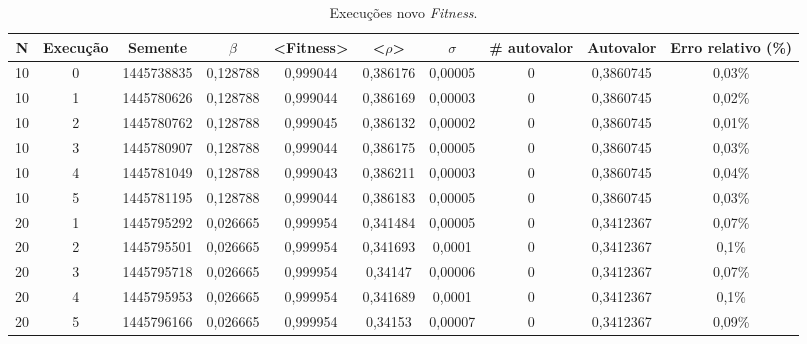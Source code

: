 	\begin{landscape}
\begin{center}
\begin{table}[htbp]
\caption{Execuções novo \textit{Fitness}.}
\label{tab:execucoesNovoFitness}
\begin{tabular}{cccccccccc}
\hline \hline
   \textbf{N} & \textbf{Execução} & \textbf{Semente} & \textbf{$\beta$} & \textbf{<Fitness>} & \textbf{<$\rho$>} & \textbf{$\sigma$} & \textbf{\# autovalor} & \textbf{Autovalor} & \textbf{Erro relativo (\%)} \\
\hline \hline
        10 &          0 & 1445738835 &   0,128788 &   0,999044 &   0,386176 &    0,00005 &          0 &  0,3860745 &     0,03\% \\
\hline
        10 &          1 & 1445780626 &   0,128788 &   0,999044 &   0,386169 &    0,00003 &          0 &  0,3860745 &     0,02\% \\
\hline
        10 &          2 & 1445780762 &   0,128788 &   0,999045 &   0,386132 &    0,00002 &          0 &  0,3860745 &     0,01\% \\
\hline
        10 &          3 & 1445780907 &   0,128788 &   0,999044 &   0,386175 &    0,00005 &          0 &  0,3860745 &     0,03\% \\
\hline
        10 &          4 & 1445781049 &   0,128788 &   0,999043 &   0,386211 &    0,00003 &          0 &  0,3860745 &     0,04\% \\
\hline
        10 &          5 & 1445781195 &   0,128788 &   0,999044 &   0,386183 &    0,00005 &          0 &  0,3860745 &     0,03\% \\
\hline
        20 &          1 & 1445795292 &   0,026665 &   0,999954 &   0,341484 &    0,00005 &          0 &  0,3412367 &     0,07\% \\
\hline
        20 &          2 & 1445795501 &   0,026665 &   0,999954 &   0,341693 &     0,0001 &          0 &  0,3412367 &      0,1\% \\
\hline
        20 &          3 & 1445795718 &   0,026665 &   0,999954 &    0,34147 &    0,00006 &          0 &  0,3412367 &     0,07\% \\
\hline
        20 &          4 & 1445795953 &   0,026665 &   0,999954 &   0,341689 &     0,0001 &          0 &  0,3412367 &      0,1\% \\
\hline
        20 &          5 & 1445796166 &   0,026665 &   0,999954 &    0,34153 &    0,00007 &          0 &  0,3412367 &     0,09\% \\

\end{tabular}
\end{table}
\end{center}
\end{landscape}
